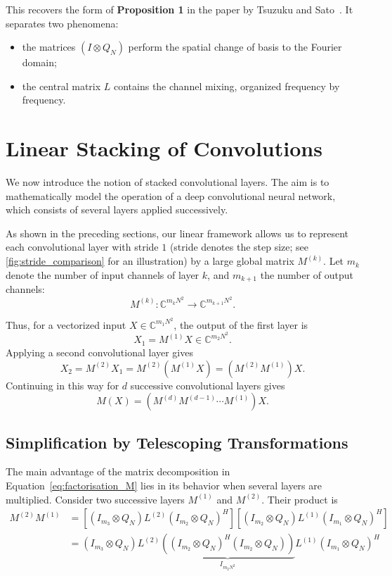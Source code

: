 This recovers the form of \textbf{Proposition 1} in the paper by Tsuzuku and Sato~\cite{tsuzuku2019structural}.
It separates two phenomena:
\begin{itemize}
    \item the matrices $(I\otimes Q_N)$ perform the spatial change of basis to the Fourier domain;
    \item the central matrix $L$ contains the channel mixing, organized frequency by frequency.
\end{itemize}

\section{Linear Stacking of Convolutions}
\label{sec:empilement-lineaire-convolutions}

We now introduce the notion of stacked convolutional layers.
The aim is to mathematically model the operation of a deep convolutional neural network, which
consists of several layers applied successively.

As shown in the preceding sections, our linear framework allows us to represent each convolutional
layer with stride \(1\) (stride denotes the step size; see \ref{fig:stride_comparison} for an illustration) by a large global matrix \(M^{(k)}\).
Let \(m_k\) denote the number of input channels of layer \(k\), and \(m_{k+1}\) the number of output channels:
\[
M^{(k)} : \mathbb{C}^{m_k N^2} \longrightarrow \mathbb{C}^{m_{k+1}N^2}.
\]

Thus, for a vectorized input \(X \in \mathbb{C}^{m_1N^2}\), the output of the
first layer is
$$
X_1 = M^{(1)} X \in \mathbb{C}^{m_2 N^2}.
$$
Applying a second convolutional layer gives
$$
X_2 = M^{(2)} X_1 = M^{(2)}(M^{(1)} X) = (M^{(2)} M^{(1)}) X.
$$
Continuing in this way for $d$ successive convolutional layers gives
\begin{equation}
M(X) = \left(M^{(d)} M^{(d-1)} \cdots M^{(1)}\right)X.
\label{eq:composition_couches}
\end{equation}

\subsection{Simplification by Telescoping Transformations}

The main advantage of the matrix decomposition in Equation~\eqref{eq:factorisation_M} lies
in its behavior when several layers are multiplied. Consider two successive
layers $M^{(1)}$ and $M^{(2)}$. Their product is
\begin{align*}
M^{(2)}M^{(1)} &= \left[ (I_{m_3} \otimes Q_N) L^{(2)} (I_{m_2} \otimes Q_N)^H \right] \left[ (I_{m_2} \otimes Q_N) L^{(1)} (I_{m_1} \otimes Q_N)^H \right] \\
&= (I_{m_3} \otimes Q_N) L^{(2)} \underbrace{\left( (I_{m_2} \otimes Q_N)^H (I_{m_2} \otimes Q_N) \right)}_{I_{m_2 N^2}} L^{(1)} (I_{m_1} \otimes Q_N)^H
\end{align*}

